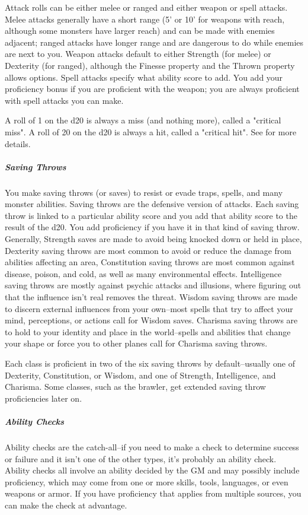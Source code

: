 Attack rolls can be either melee or ranged and either weapon or spell attacks. Melee attacks generally have a short range (5' or 10' for weapons with reach, although some monsters have larger reach) and can be made with enemies adjacent; ranged attacks have longer range and are dangerous to do while enemies are next to you. Weapon attacks default to either Strength (for melee) or Dexterity (for ranged), although the Finesse property and the Thrown property allows options. Spell attacks specify what ability score to add. You add your proficiency bonus if you are proficient with the weapon; you are always proficient with spell attacks you can make.

A roll of 1 on the d20 is always a miss (and nothing more), called a "critical miss". A roll of 20 on the d20 is always a hit, called a "critical hit". See  for more details.

\subparagraph*{Saving Throws} You make saving throws (or saves) to resist or evade traps, spells, and many monster abilities. Saving throws are the defensive version of attacks. Each saving throw is linked to a particular ability score and you add that ability score to the result of the d20. You add proficiency if you have it in that kind of saving throw. Generally, Strength saves are made to avoid being knocked down or held in place, Dexterity saving throws are most common to avoid or reduce the damage from abilities affecting an area, Constitution saving throws are most common against disease, poison, and cold, as well as many environmental effects. Intelligence saving throws are mostly against psychic attacks and illusions, where figuring out that the influence isn't real removes the threat. Wisdom saving throws are made to discern external influences from your own--most spells that try to affect your mind, perceptions, or actions call for Wisdom saves. Charisma saving throws are to hold to your identity and place in the world--spells and abilities that change your shape or force you to other planes call for Charisma saving throws.

Each class is proficient in two of the six saving throws by default--usually one of Dexterity, Constitution, or Wisdom, and one of Strength, Intelligence, and Charisma. Some classes, such as the brawler, get extended saving throw proficiencies later on.

\subparagraph*{Ability Checks} Ability checks are the catch-all--if you need to make a check to determine success or failure and it isn't one of the other types, it's probably an ability check. Ability checks all involve an ability decided by the GM and may possibly include proficiency, which may come from one or more skills, tools, languages, or even weapons or armor. If you have proficiency that applies from multiple sources, you can make the check at advantage.

